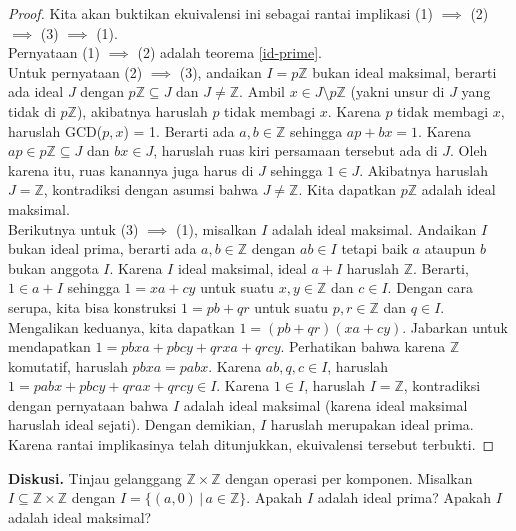 	\begin{proof}
		Kita akan buktikan ekuivalensi ini sebagai rantai implikasi (1) $\implies$ (2) $\implies$ (3) $\implies$ (1).\\
		
		Pernyataan (1) $\implies$ (2) adalah teorema \ref{id-prime}. \\
		
		Untuk pernyataan (2) $\implies$ (3), andaikan $I = p\mathbb{Z}$ bukan ideal maksimal, berarti ada ideal $J$ dengan $p\mathbb{Z} \subseteq J$ dan $J \ne \mathbb{Z}$. Ambil $x \in J \setminus p\mathbb{Z}$ (yakni unsur di $J$ yang tidak di $p\mathbb{Z}$), akibatnya haruslah $p$ tidak membagi $x$. Karena $p$ tidak membagi $x$, haruslah GCD($p,x$) = 1. Berarti ada $a,b \in \mathbb{Z}$ sehingga $ap + bx = 1$. Karena $ap \in p\mathbb{Z} \subseteq J$ dan $bx \in J$, haruslah ruas kiri persamaan tersebut ada di $J$. Oleh karena itu, ruas kanannya juga harus di $J$ sehingga $1 \in J$. Akibatnya haruslah $J = \mathbb{Z}$, kontradiksi dengan asumsi bahwa $J \ne \mathbb{Z}$. Kita dapatkan $p\mathbb{Z}$ adalah ideal maksimal.
		\\
		
		Berikutnya untuk (3) $\implies$ (1), misalkan $I$ adalah ideal maksimal. Andaikan $I$ bukan ideal prima, berarti ada $a,b \in \mathbb{Z}$ dengan $ab \in I$ tetapi baik $a$ ataupun $b$ bukan anggota $I$. Karena $I$ ideal maksimal, ideal $a + I$ haruslah $\mathbb{Z}$. Berarti, $1 \in a+I$ sehingga $1 = xa + cy$ untuk suatu $x, y \in \mathbb{Z}$ dan $c \in I$. Dengan cara serupa, kita bisa konstruksi $1 = pb + qr$ untuk suatu $p,r \in \mathbb{Z}$ dan $q \in I$. Mengalikan keduanya, kita dapatkan $1 = (pb+qr)(xa+cy)$. Jabarkan untuk mendapatkan $1 = pbxa + pbcy + qrxa + qrcy$. Perhatikan bahwa karena $\mathbb{Z}$ komutatif, haruslah $pbxa = pabx$. Karena $ab, q, c \in I$, haruslah $1 = pabx + pbcy + qrax + qrcy \in I$. Karena $1 \in I$, haruslah $I = \mathbb{Z}$, kontradiksi dengan pernyataan bahwa $I$ adalah ideal maksimal (karena ideal maksimal haruslah ideal sejati). Dengan demikian, $I$ haruslah merupakan ideal prima.
		\\
		
		Karena rantai implikasinya telah ditunjukkan, ekuivalensi tersebut terbukti.
	\end{proof}
	\textbf{Diskusi.} Tinjau gelanggang $\mathbb{Z} \times \mathbb{Z}$ dengan operasi per komponen. Misalkan $I \subseteq \mathbb{Z} \times \mathbb{Z}$ dengan $I = \{ (a,0) \, | \, a \in \mathbb{Z} \}$. Apakah $I$ adalah ideal prima? Apakah $I$ adalah ideal maksimal?\\
	
